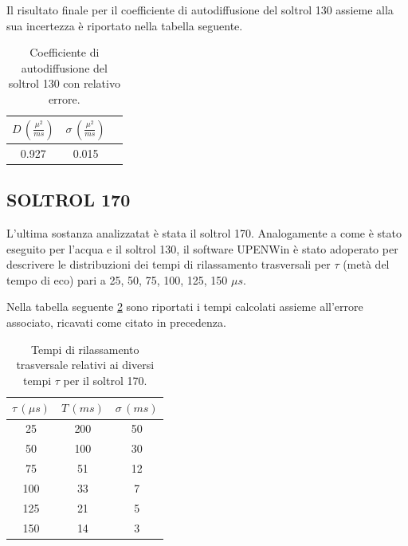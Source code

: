 Il risultato finale per il coefficiente di autodiffusione del soltrol 130 assieme alla sua incertezza è riportato nella tabella seguente.

\begin{table}
    \begin{center}
    \begin{tabular}{c c c}
    \toprule
    	$D\,(\frac{{\mu}^2}{ms})$ & $\sigma\,(\frac{{\mu}^2}{ms})$ \\
    \midrule
    	0.927	&	0.015	\\
    \bottomrule
    \end{tabular}
    \caption{Coefficiente di autodiffusione del soltrol 130 con relativo errore.}
    \label{tab:Df_s130}
    \end{center}
\end{table}


\subsection*{SOLTROL 170}

L'ultima sostanza analizzatat è stata il soltrol 170.
Analogamente a come è stato eseguito per l'acqua e il soltrol 130, il software UPENWin è stato adoperato per descrivere le distribuzioni dei tempi di rilassamento trasversali per $\tau$ (metà del tempo di eco) pari a 25, 50, 75, 100, 125, 150 ${\mu}s$.

Nella tabella seguente \ref{tab:T_s170} sono riportati i tempi calcolati assieme all'errore associato, ricavati come citato in precedenza.

\begin{table}
    \begin{center}
    \begin{tabular}{c c c}
    \toprule
    	${\tau}\,({\mu}s)$ & $T\,(ms)$ & ${\sigma}\,(ms)$ \\
    \midrule
	 25 & 200 & 50 \\
	 50 & 100 & 30 \\
	 75 & 51 & 12 \\
	 100 & 33 & 7 \\
	 125 & 21 & 5 \\
	 150 & 14 & 3 \\
    \bottomrule
    \end{tabular}
    \caption{Tempi di rilassamento trasversale relativi ai diversi tempi $\tau$ per il soltrol 170.}
    \label{tab:T_s170}
    \end{center}
\end{table}

